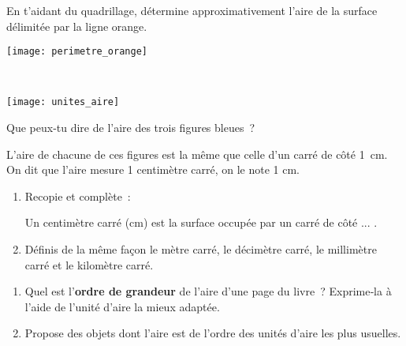 \begin{activite}[Comparaisons]
\begin{partie}
\begin{minipage}[c]{0.48\linewidth}
En t'aidant du quadrillage, détermine  approximativement l'aire de la surface délimitée par la ligne orange.
 \end{minipage} \hfill%
 \begin{minipage}[c]{0.48\linewidth}
  \texttt{[image: perimetre\_orange]}
  \end{minipage} \\
\end{partie}

\end{activite}


\begin{activite}

\begin{center} \texttt{[image: unites\_aire]} \end{center}

\begin{partie}
Que peux‑tu dire de l'aire des trois figures bleues ?
\end{partie}

\begin{partie}
L'aire de chacune de ces figures est la même que celle d'un carré de côté 1 cm. On dit que l'aire mesure 1 centimètre carré, on le note 1 cm.
\begin{enumerate}
 \item Recopie et complète :
 \begin{center} \textcolor{B2}{Un centimètre carré (cm) est la surface occupée par un carré de côté ... .} \end{center}
 \item Définis de la même façon le mètre carré, le décimètre carré, le millimètre carré et le kilomètre carré.
 \end{enumerate}
\end{partie}

\begin{partie}
\begin{enumerate}
 \item Quel est l'\textbf{ordre de grandeur} de l'aire d'une page du livre ? Exprime‑la à l'aide de l'unité d'aire la mieux adaptée.
 \item Propose des objets dont l'aire est de l'ordre des unités d'aire les plus usuelles.
 \end{enumerate}
\end{partie}


\end{activite}
